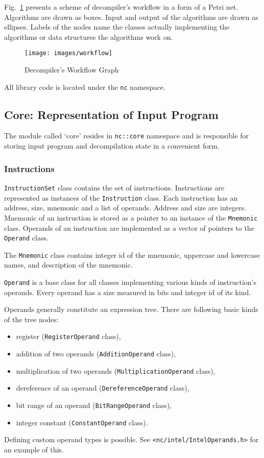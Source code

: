 \documentclass[a4paper,12pt]{article}
\newcommand{\ident}[1]{\texttt{#1}}
\begin{document}
Fig.~\ref{figure:workflow} presents a scheme of decompiler's workflow in a form of a Petri net.
Algorithms are drawn as boxes.
Input and output of the algorithms are drawn as ellipses.
Labels of the nodes name the classes actually implementing the algorithms or data structures the algorithms work on.

\begin{figure}[!htb]
\texttt{[image: images/workflow]}
\caption{Decompiler's Workflow Graph}
\label{figure:workflow}
\end{figure}

All library code is located under the \ident{nc} namespace.

\subsection{Core: Representation of Input Program}

The module called `core' resides in \ident{nc::core} namespace and is responsible for storing input program and decompilation state in a convenient form.

\subsubsection{Instructions}

\ident{InstructionSet} class contains the set of instructions.
Instructions are represented as instances of the \ident{Instruction} class.
Each instruction has an address, size, mnemonic and a list of operands.
Address and size are integers.
Mnemonic of an instruction is stored as a pointer to an instance of the \ident{Mnemonic} class.
Operands of an instruction are implemented as a vector of pointers to the \ident{Operand} class.

The \ident{Mnemonic} class contains integer id of the mnemonic, uppercase and lowercase names, and description of the mnemonic.

\ident{Operand} is a base class for all classes implementing various kinds of instruction's operands.
Every operand has a size measured in bits and integer id of its kind.

Operands generally constitute an expression tree.
There are following basic kinds of the tree nodes:
\begin{itemize}
\item register (\ident{RegisterOperand} class),
\item addition of two operands (\ident{AdditionOperand} class),
\item multiplication of two operands (\ident{MultiplicationOperand} class),
\item dereference of an operand (\ident{DereferenceOperand} class),
\item bit range of an operand (\ident{BitRangeOperand} class),
\item integer constant (\ident{ConstantOperand} class).
\end{itemize}
Defining custom operand types is possible.
See \verb|<nc/intel/IntelOperands.h>| for an example of this.
\end{document}

